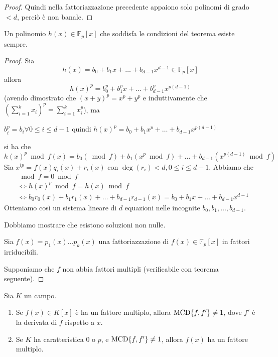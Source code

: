 \documentclass[../main.tex]{subfiles}
\begin{document}
\begin{proof}
    Quindi nella fattoriazzazione precedente appaiono solo polinomi di grado $< d$, perciò è non banale.
\end{proof}

\begin{proposition}
    Un polinomio $h(x) \in \mathbb{F}_p[x]$ che soddisfa le condizioni del teorema esiste sempre.
\end{proposition}
\begin{proof}
    Sia
    \begin{equation*}
        h(x) = b_0 + b_1 x + \ldots + b_{d - 1} x^{d - 1} \in \mathbb{F}_p[x]
    \end{equation*}
    allora
    \begin{equation*}
        h(x)^p = b_0^p + b_1^p x + \ldots + b_{d - 1}^p x^{p(d - 1)}
    \end{equation*}
    (avendo dimostrato che $(x + y)^p = x^p + y^p$ e induttivamente che $(\sum_{i=1}^{k} x_i)^p = \sum_{i=1}^{k} x_i^p$), ma
    \begin{center}
        $b_i^p = b_i \forall 0 \leq i \leq d - 1$ quindi $h(x)^p = b_0 + b_1 x^p + \ldots + b_{d - 1} x^{p(d - 1)}$
    \end{center}
    si ha che
    \begin{equation*}
        h(x)^p \bmod f(x) = b_0 (\bmod f) + b_1 (x^p \bmod f) + \ldots + b_{d - 1} (x^{p(d - 1)} \bmod f)
    \end{equation*}
    Sia $x^{ip} = f(x) q_i(x) + r_i(x)$ con $\deg(r_i) < d, 0 \leq i \leq d - 1$. Abbiamo che
    \begin{align*}
        [h(x)^p - h(x)] & \bmod f = 0 \bmod f                                                                                         \\
                        & \iff h(x)^p \bmod f = h(x) \bmod f                                                                          \\
                        & \iff b_0 r_0(x) + b_1 r_1(x) + \ldots + b_{d - 1} r_{d - 1}(x) = b_0 + b_1 x + \ldots + b_{d - 1} x^{d - 1}
    \end{align*}
    Otteniamo così un sistema lineare di $d$ equazioni nelle incognite $b_0, b_1, \ldots, b_{d-1}$.

    Dobbiamo mostrare che esistono soluzioni non nulle.

    Sia $f(x) = p_1(x) \ldots p_k(x)$ una fattoriazzazione di $f(x) \in \mathbb{F}_p[x]$ in fattori irriducibili.

    Supponiamo che $f$ non abbia fattori multipli (verificabile con teorema seguente).
\end{proof}

\begin{theorem}
    Sia $K$ un campo.
    \begin{enumerate}[label=\alph*)]
        \item Se $f(x) \in K[x]$ è ha un fattore multiplo, allora $\operatorname{MCD}\{f, f'\} \neq 1$, dove $f'$ è la derivata di $f$ rispetto a $x$.
        \item Se $K$ ha caratteristica 0 o $p$, e $\operatorname{MCD}\{f, f'\} \neq 1$, allora $f(x)$ ha un fattore multiplo.
    \end{enumerate}
\end{theorem}
\end{document}
